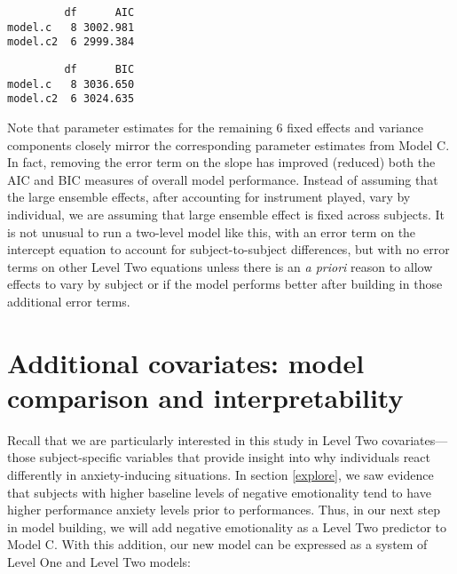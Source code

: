 \documentclass[
]{krantz}
\begin{document}
\begin{verbatim}
         df      AIC
model.c   8 3002.981
model.c2  6 2999.384
\end{verbatim}

\begin{verbatim}
         df      BIC
model.c   8 3036.650
model.c2  6 3024.635
\end{verbatim}

Note that parameter estimates for the remaining 6 fixed effects and variance components closely mirror the corresponding parameter estimates from Model C. In fact, removing the error term on the slope has improved (reduced) both the AIC and BIC measures of overall model performance. Instead of assuming that the large ensemble effects, after accounting for instrument played, vary by individual, we are assuming that large ensemble effect is fixed across subjects. It is not unusual to run a two-level model like this, with an error term on the intercept equation to account for subject-to-subject differences, but with no error terms on other Level Two equations unless there is an \emph{a priori} reason to allow effects to vary by subject or if the model performs better after building in those additional error terms.

\hypertarget{sec:modeld}{%
\section{Additional covariates: model comparison and interpretability}\label{sec:modeld}}

Recall that we are particularly interested in this study in Level Two covariates---those subject-specific variables that provide insight into why individuals react differently in anxiety-inducing situations. In section \ref{explore}, we saw evidence that subjects with higher baseline levels of negative emotionality tend to have higher performance anxiety levels prior to performances. Thus, in our next step in model building, we will add negative emotionality as a Level Two predictor to Model C. With this addition, our new model can be expressed as a system of Level One and Level Two models:
\end{document}

